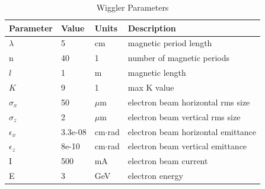 \documentclass[preprint]{iucr}              %
\begin{document}
\begin{table}\label{ivwbalder}
\caption{Wiggler Parameters}
\begin{tabular}{@{}llll@{}}
\toprule
Parameter       & Value         & Units     & Description                           \\
\hline
$\lambda$       & 5             & cm        & magnetic period length                \\
n               & 40            & 1         & number of magnetic periods            \\ 
$l$             & 1             & m         & magnetic length                       \\
$K$             & 9             & 1         & max K value                           \\
$\sigma_x$      & 50            & $\mu$m    & electron beam horizontal rms size     \\
$\sigma_z$      & 2             & $\mu$m    & electron beam vertical rms size       \\
$\epsilon_x$    & 3.3e-08       & cm$\cdot$rad    & electron beam horizontal emittance    \\
$\epsilon_z$    & 8e-10         & cm$\cdot$rad    & electron beam vertical emittance      \\
I               & 500           & mA        & electron beam current                 \\
E               & 3             & GeV       & electron energy                       \\
\end{tabular}
\end{table}
\end{document}
